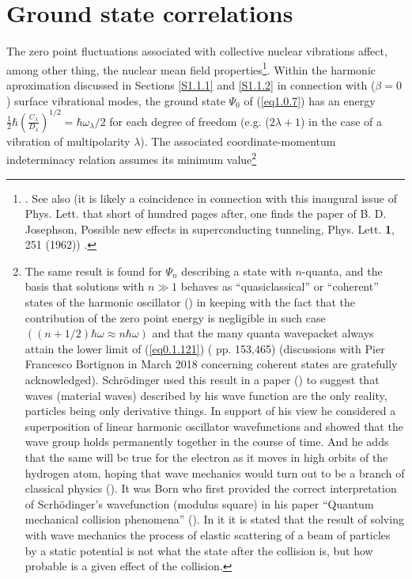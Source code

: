 \section{Ground state correlations}\label{S1.8}
The zero point fluctuations associated with collective nuclear vibrations affect, among other thing, the nuclear mean field properties\footnote{\cite{Gogny:78,Esbensen:83,Reinhard:79,Khodel:82,Barranco:87a,Barranco:85}. See also \cite{Brown:63,Anderson:62} (it is likely a coincidence in connection with this inaugural issue of Phys. Lett. that short of hundred pages after, one finds the paper of B. D. Josephson, Possible new effects in superconducting tunneling, Phys. Lett. \textbf{1}, 251 (1962)) .}. Within the harmonic aproximation discussed in Sections \ref{S1.1.1} and \ref{S1.1.2} in connection with ($\beta=0$) surface vibrational modes, the ground state $\Psi_0$ of (\ref{eq1.0.7}) has an energy $\frac{1}{2}\hbar\left(\frac{C_\lambda}{D_\lambda}\right)^{1/2}=\hbar\omega_\lambda/2$ for each degree of freedom (e.g. ($2\lambda+1$) in the case of a vibration of multipolarity $\lambda$). The associated coordinate-momentum indeterminacy relation assumes its minimum value\footnote{The same result is found for $\Psi_n$ describing a state with $n$-quanta, and the basis that solutions with $n\gg1$ behaves as ``quasiclassical'' or ``coherent'' states of the harmonic oscillator (\cite{Glauber:07}) in keeping with the fact that the contribution of the zero point energy is negligible in such case $((n+1/2)\hbar\omega\approx n\hbar\omega)$ and that the many quanta wavepacket always attain the lower limit of (\ref{eq0.1.121}) (\cite{Basdevant:05} pp. 153,465) (discussions with Pier Francesco Bortignon in March 2018 concerning coherent states are gratefully acknowledged). Schr\"odinger used this result  in a paper (\cite{Schrodinger:26}) to suggest that waves (material waves) described by his wave function are the only reality, particles being only derivative things. In support of his view he considered a superposition of linear harmonic oscillator wavefunctions and showed that the wave group holds permanently together in the course of time. And he adds that the same will be true for the electron as it moves in high orbits of the hydrogen atom, hoping that wave mechanics would turn out to be a branch of classical physics (\cite{Pais:00}). It was Born who first provided the correct interpretation of Scrh\"odinger's wavefunction (modulus square) in his paper ``Quantum mechanical collision phenomena'' (\cite{Born:26}). In it it is stated that the result of solving with wave mechanics the process of elastic scattering of a beam of particles by a static potential is not what the state after the collision is, but how probable is a given effect of the collision.}
